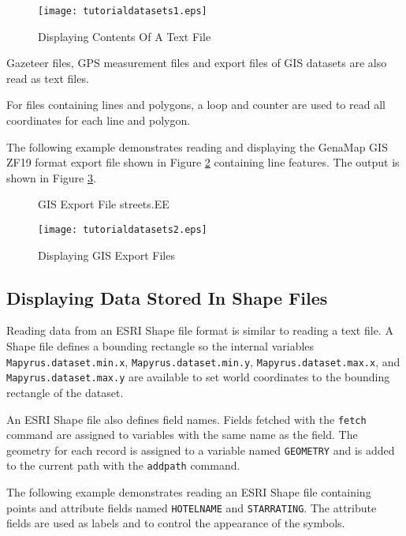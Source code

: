

\begin{figure}[htb]
\texttt{[image: tutorialdatasets1.eps]}
\caption{Displaying Contents Of A Text File}
\label{tutorialdatasets1}
\end{figure}

Gazeteer files, GPS measurement files and export files of GIS datasets
are also read as text files.

For files containing lines and polygons, a loop and counter
are used to read all coordinates for each line and polygon.

The following example demonstrates
reading and displaying the GenaMap GIS ZF19 format export file shown in Figure
\ref{streetsEE} containing line
features.
The output is shown in Figure \ref{tutorialdatasets2}.

\begin{figure}[htb]

\caption{GIS Export File streets.EE}
\label{streetsEE}
\end{figure}



\begin{figure}[htb]
\texttt{[image: tutorialdatasets2.eps]}
\caption{Displaying GIS Export Files}
\label{tutorialdatasets2}
\end{figure}

\subsection{Displaying Data Stored In Shape Files}

Reading data from an ESRI Shape file format is similar to reading a text file.
A Shape file defines a bounding rectangle so the internal variables
\texttt{Mapyrus.dataset.min.x}, \texttt{Mapyrus.dataset.min.y},
\texttt{Mapyrus.dataset.max.x}, and \texttt{Mapyrus.dataset.max.y} are
available to set world coordinates to the bounding rectangle of the dataset.

An ESRI Shape file also defines field names.  Fields fetched with the
\texttt{fetch} command are assigned to variables with the same name as the
field.  The geometry for each record is assigned to a variable named
\texttt{GEOMETRY} and is added to the current path with the \texttt{addpath}
command.

The following example demonstrates reading an ESRI Shape file containing points
and attribute fields named \texttt{HOTELNAME} and \texttt{STARRATING}.  The
attribute fields are used as labels and to control the appearance of the
symbols.

